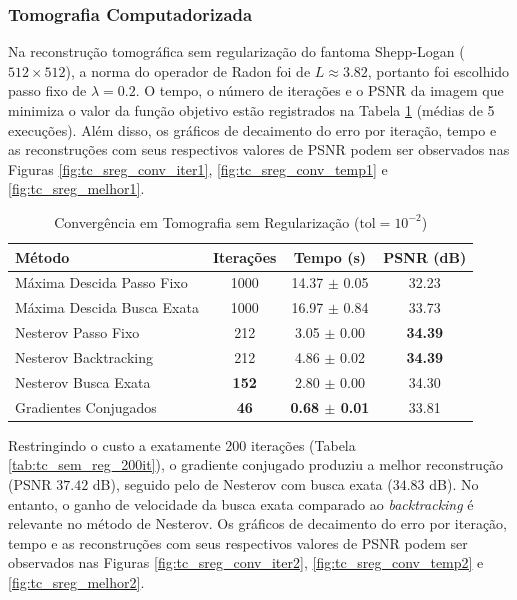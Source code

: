 \documentclass[12pt]{article}
\begin{document}
\subsubsection{Tomografia Computadorizada}

Na reconstrução tomográfica sem regularização do fantoma Shepp-Logan ($512 \times 512$), a norma do operador de Radon foi de $L \approx 3.82$, portanto foi escolhido passo fixo de $\lambda = 0.2$. O tempo, o número de iterações e o PSNR da imagem que minimiza o valor da função objetivo estão registrados na Tabela \ref{tab:tc_sem_reg_tol_1e2} (médias de 5 execuções). Além disso, os gráficos de decaimento do erro por iteração, tempo e as reconstruções com seus respectivos valores de PSNR podem ser observados nas Figuras \ref{fig:tc_sreg_conv_iter1}, \ref{fig:tc_sreg_conv_temp1} e \ref{fig:tc_sreg_melhor1}.

\begin{table}[H]
    \centering
    \caption{Convergência em Tomografia sem Regularização ($\text{tol} = 10^{-2}$)}
    \label{tab:tc_sem_reg_tol_1e2}
    \begin{tabular}{lccc}
        \toprule
        \textbf{Método} & \textbf{Iterações} & \textbf{Tempo (s)} & \textbf{PSNR (dB)} \\
        \midrule
        Máxima Descida Passo Fixo & 1000 & 14.37 $\pm$ 0.05 & 32.23 \\
        Máxima Descida Busca Exata & 1000 & 16.97 $\pm$ 0.84 & 33.73 \\
        Nesterov Passo Fixo & 212 & 3.05 $\pm$ 0.00 & \textbf{34.39} \\
        Nesterov Backtracking & 212 & 4.86 $\pm$ 0.02 & \textbf{34.39} \\
        Nesterov Busca Exata & \textbf{152} & 2.80 $\pm$ 0.00 & 34.30 \\
        Gradientes Conjugados & \textbf{46} & \textbf{0.68 $\pm$ 0.01} & 33.81 \\
        \bottomrule
    \end{tabular}
\end{table}

Restringindo o custo a exatamente 200 iterações (Tabela \ref{tab:tc_sem_reg_200it}), o gradiente conjugado produziu a melhor reconstrução (PSNR $37.42$ dB), seguido pelo de Nesterov com busca exata ($34.83$ dB). No entanto, o ganho de velocidade da busca exata comparado ao \textit{backtracking} é relevante no método de Nesterov. Os gráficos de decaimento do erro por iteração, tempo e as reconstruções com seus respectivos valores de PSNR podem ser observados nas Figuras \ref{fig:tc_sreg_conv_iter2}, \ref{fig:tc_sreg_conv_temp2} e \ref{fig:tc_sreg_melhor2}.
\end{document}
